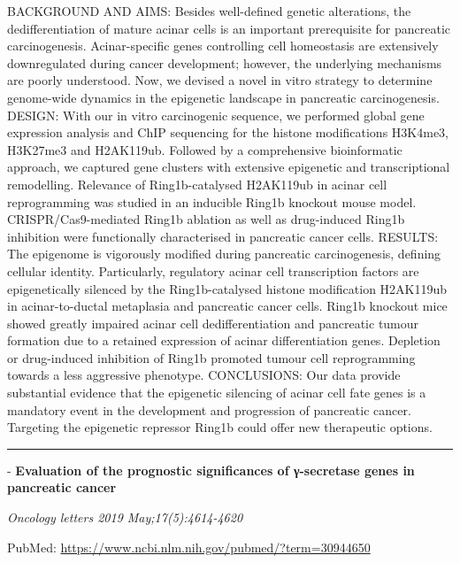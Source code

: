 \documentclass[]{article}
\begin{document}
BACKGROUND AND AIMS: Besides well-defined genetic alterations, the
dedifferentiation of mature acinar cells is an important prerequisite
for pancreatic carcinogenesis. Acinar-specific genes controlling cell
homeostasis are extensively downregulated during cancer development;
however, the underlying mechanisms are poorly understood. Now, we
devised a novel in vitro strategy to determine genome-wide dynamics in
the epigenetic landscape in pancreatic carcinogenesis. DESIGN: With our
in vitro carcinogenic sequence, we performed global gene expression
analysis and ChIP sequencing for the histone modifications H3K4me3,
H3K27me3 and H2AK119ub. Followed by a comprehensive bioinformatic
approach, we captured gene clusters with extensive epigenetic and
transcriptional remodelling. Relevance of Ring1b-catalysed H2AK119ub in
acinar cell reprogramming was studied in an inducible Ring1b knockout
mouse model. CRISPR/Cas9-mediated Ring1b ablation as well as
drug-induced Ring1b inhibition were functionally characterised in
pancreatic cancer cells. RESULTS: The epigenome is vigorously modified
during pancreatic carcinogenesis, defining cellular identity.
Particularly, regulatory acinar cell transcription factors are
epigenetically silenced by the Ring1b-catalysed histone modification
H2AK119ub in acinar-to-ductal metaplasia and pancreatic cancer cells.
Ring1b knockout mice showed greatly impaired acinar cell
dedifferentiation and pancreatic tumour formation due to a retained
expression of acinar differentiation genes. Depletion or drug-induced
inhibition of Ring1b promoted tumour cell reprogramming towards a less
aggressive phenotype. CONCLUSIONS: Our data provide substantial evidence
that the epigenetic silencing of acinar cell fate genes is a mandatory
event in the development and progression of pancreatic cancer. Targeting
the epigenetic repressor Ring1b could offer new therapeutic options.

{}

{}

\begin{center}\rule{0.5\linewidth}{\linethickness}\end{center}

 - \textbf{Evaluation of the prognostic significances of γ-secretase
genes in pancreatic cancer}

\emph{Oncology letters 2019 May;17(5):4614-4620}

PubMed: \url{https://www.ncbi.nlm.nih.gov/pubmed/?term=30944650}
\end{document}
